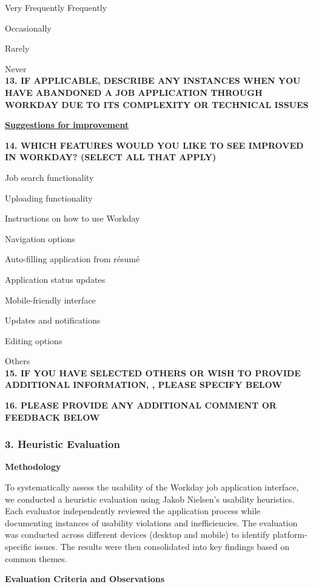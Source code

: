 \documentclass[
	letterpaper, %
]{jdf}
\begin{document}
Very Frequently
Frequently

Occasionally

Rarely

Never \\

\textbf{13. IF APPLICABLE, DESCRIBE ANY INSTANCES WHEN YOU HAVE ABANDONED A JOB APPLICATION THROUGH WORKDAY DUE TO ITS COMPLEXITY OR TECHNICAL ISSUES 
}

\underline{\textbf{Suggestions for improvement }}

\textbf{14. WHICH FEATURES WOULD YOU LIKE TO SEE IMPROVED IN WORKDAY? (SELECT ALL THAT APPLY)
}

Job search functionality

Uploading functionality

Instructions on how to use Workday

Navigation options

Auto-filling application from résumé  

Application status updates 

Mobile-friendly interface

Updates and notifications

Editing options 

Others \\

\textbf{15. IF YOU HAVE SELECTED OTHERS OR WISH TO PROVIDE ADDITIONAL INFORMATION, , PLEASE SPECIFY BELOW}

\textbf{16. PLEASE PROVIDE ANY ADDITIONAL COMMENT OR FEEDBACK BELOW	
}
\hfill \break
\hfill \break
\subsubsection{3. Heuristic Evaluation}

\textbf{Methodology}  

To systematically assess the usability of the Workday job application interface, we conducted a heuristic evaluation using Jakob Nielsen’s usability heuristics. Each evaluator independently reviewed the application process while documenting instances of usability violations and inefficiencies. The evaluation was conducted across different devices (desktop and mobile) to identify platform-specific issues. The results were then consolidated into key findings based on common themes.  

\textbf{Evaluation Criteria and Observations}  
\end{document}
